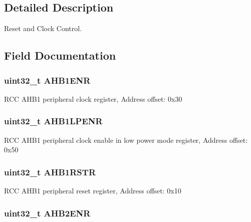 \subsection{Detailed Description}
Reset and Clock Control. 

\subsection{Field Documentation}
\hypertarget{struct_r_c_c___type_def_a1e9c75b06c99d0611535f38c7b4aa845}{
\subsubsection[{A\-H\-B1\-E\-N\-R}]{ uint32\-\_\-t A\-H\-B1\-E\-N\-R}}\label{struct_r_c_c___type_def_a1e9c75b06c99d0611535f38c7b4aa845}
R\-C\-C A\-H\-B1 peripheral clock register, Address offset\-: 0x30 \hypertarget{struct_r_c_c___type_def_aae70b1922167eb58d564cb82d39fd10b}{
\subsubsection[{A\-H\-B1\-L\-P\-E\-N\-R}]{ uint32\-\_\-t A\-H\-B1\-L\-P\-E\-N\-R}}\label{struct_r_c_c___type_def_aae70b1922167eb58d564cb82d39fd10b}
R\-C\-C A\-H\-B1 peripheral clock enable in low power mode register, Address offset\-: 0x50 \hypertarget{struct_r_c_c___type_def_a46c20c598e9e12f919f0ea47ebcbc90f}{
\subsubsection[{A\-H\-B1\-R\-S\-T\-R}]{ uint32\-\_\-t A\-H\-B1\-R\-S\-T\-R}}\label{struct_r_c_c___type_def_a46c20c598e9e12f919f0ea47ebcbc90f}
R\-C\-C A\-H\-B1 peripheral reset register, Address offset\-: 0x10 \hypertarget{struct_r_c_c___type_def_a5e92ed32c33c92e7ebf6919400ad535b}{
\subsubsection[{A\-H\-B2\-E\-N\-R}]{ uint32\-\_\-t A\-H\-B2\-E\-N\-R}}\label{struct_r_c_c___type_def_a5e92ed32c33c92e7ebf6919400ad535b}
